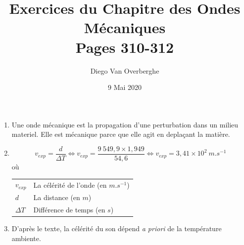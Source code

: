 \documentclass[12pt, a4paper]{article}
\makeatletter
\newenvironment{conditions}
  {\par\vspace{\abovedisplayskip}\noindent\begin{tabular}{>{$}l<{$} @{${\quad}={\quad}$} l}}
  {\end{tabular}\par\vspace{\belowdisplayskip}}
\makeatother
\begin{document}
    
    \title{Exercices du Chapitre des Ondes Mécaniques \\ \Large{Pages 310-312}}
    \author{Diego Van Overberghe}
    \date{9 Mai 2020}
    \maketitle

    \begin{Exercise}[number={24}]
        \begin{enumerate}[1.]
            \item Une onde mécanique est la propagation d'une perturbation dans un milieu materiel. Elle est mécanique parce que elle agit en deplaçant la matière.
        \item   \begin{equation*}
                    v_{exp}=\frac{d}{\Delta T}
                    \iff v_{exp}=\frac{9\ 549{,}9\times 1{,}949}{54{,}6}
                    \iff v_{exp}=3{,}41\times 10^2\ m.s^{-1}
                \end{equation*} où
                \begin{conditions}
                    v_{exp}  & La célérité de l'onde (en $m.s^{-1}$) \\
                    d        & La distance (en $m$) \\
                    \Delta T & Différence de temps (en $s$)
                \end{conditions}

        \item D'après le texte, la célérité du son dépend \textit{a priori} de la température ambiente.                
        \end{enumerate}
    \end{Exercise}
\end{document}
